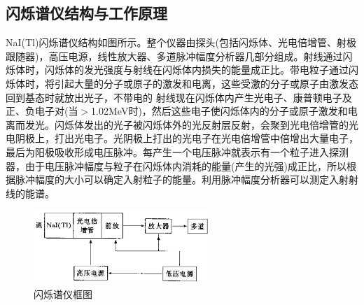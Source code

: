 \documentclass[a4paper]{article}
\begin{document}
\subsection{闪烁谱仪结构与工作原理}
NaI(Tl)闪烁谱仪结构如图所示。整个仪器由探头(包括闪烁体、光电倍增管、射极跟随器)，高压电源，线性放大器、多道脉冲幅度分析器几部分组成。射线通过闪烁体时，闪烁体的发光强度与射线在闪烁体内损失的能量成正比。带电粒子通过闪烁体时，将引起大量的分子或原子的激发和电离，这些受激的分子或原子由激发态回到基态时就放出光子，不带电的 射线现在闪烁体内产生光电子、康普顿电子及正、负电子对(当$>$1.02MeV时)，然后这些电子使闪烁体内的分子或原子激发和电离而发光。闪烁体发出的光子被闪烁体外的光反射层反射，会聚到光电倍增管的光电阴极上，打出光电子。光阴极上打出的光电子在光电倍增管中倍增出大量电子，最后为阳极吸收形成电压脉冲。每产生一个电压脉冲就表示有一个粒子进入探测器，由于电压脉冲幅度与粒子在闪烁体内消耗的能量(产生的光强)成正比，所以根据脉冲幅度的大小可以确定入射粒子的能量。利用脉冲幅度分析器可以测定入射射线的能谱。
\begin{figure}[!h]
	\centering
	\includegraphics[width=0.6\textwidth]{fig/fig3.pdf}
	\caption{闪烁谱仪框图}\label{fig3}
\end{figure}
\end{document}
